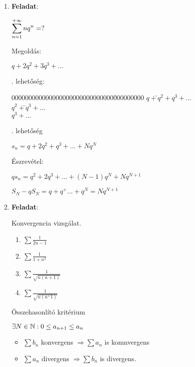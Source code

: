 \documentclass[a4paper,11.5pt]{article}
\begin{document}
	\begin{enumerate}
	
	\item \textbf{Feladat}:
	
	$\displaystyle\sum_{n=1}^{+\infty} nq^n=?$
	
		\medskip
	Megoldás:
	\begin{center}
		$q+2q^2+3q^3+\ldots$
	\end{center}
		. lehetőség:
	
	\medskip
	\begin{tabbing}
000000000000000000000000000000\=000000000\kill
		\>$q+$\=$q^2+q^3+\ldots$
		\\
			\>\>$q^2+$\=$q^3+\ldots$
		\\
		 \>\>\>$q^3+\ldots$
	\end{tabbing}
	
	
	. lehetőség
	\begin{center}
		
	$s_n=q+2q^2+q^3+\ldots+Nq^N$
	
	\end{center}
	Észrevétel: 
	\begin{center}
		
	$qs_n=q^2+2q^3+\ldots+(N-1)q^N+Nq^{N+1}$
	
	$S_N-qS_N=q+q^+\ldots+q^N=Nq^{N+1}$
	
	\end{center}
	\medskip
	\item \textbf{Feladat}:
	
	Konvergencia vizsgálat.
	\begin{enumerate}
		\item \label{1}$\sum \frac{1}{2n-1}$
		\item \label{2}$\sum \frac{1}{1+n^2}$
		\item \label{3}$\sum\frac{1}{\sqrt{n(n+1)}}$
		\item \label{4}$\sum \frac{1}{\sqrt{n(n^+1)}}$
	\end{enumerate}
	
	\bigskip
	Összehasonlító kritérium
	
	$\exists N \in \mathbb{N}: 0\leq a_{n+1} \leq a_n$
	\begin{itemize}
		\item $\sum b_n$ konvergens	 $\Rightarrow \sum a_n$ is komnvergens
		\item $\sum a_n$ divergens $\Rightarrow \sum b_n$ is divergens.
	\end{itemize}
	
	
	

\end{enumerate}
\end{document}
